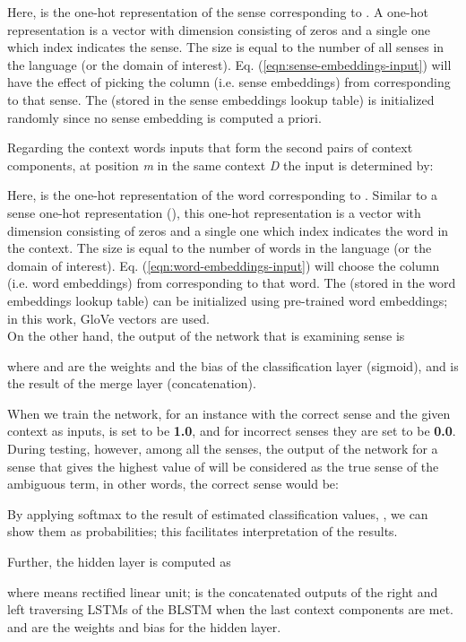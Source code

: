 \documentclass{llncs}
\begin{document}
Here,  is the one-hot representation of the sense corresponding to . A one-hot representation is a vector with dimension  consisting of  zeros and a single one which index indicates the sense. The  size is equal to the number of all senses in the language (or the domain of interest). Eq. (\ref{eqn:sense-embeddings-input}) will have the effect of picking the column (i.e. sense embeddings) from  corresponding to that sense. The  (stored in the sense embeddings lookup table) is initialized randomly since no sense embedding is computed a priori.


Regarding the context words inputs that form the second pairs of context components, at position \textit{m} in the same context \textit{D} the input is determined by:

Here,  is the one-hot representation of the word corresponding to . Similar to a sense one-hot representation (), this one-hot representation is a vector with dimension  consisting of  zeros and a single one which index indicates the word in the context. The  size is equal to the number of words in the language (or the domain of interest). Eq. (\ref{eqn:word-embeddings-input}) will choose the column (i.e. word embeddings) from  corresponding to that word. The  (stored in the word embeddings lookup table) can be initialized using pre-trained word embeddings; in this work, GloVe vectors are used.\\

On the other hand, the output of the network that is examining sense  is

where  and  are the weights and the bias of the classification layer (sigmoid), and  is the result of the merge layer (concatenation).

When we train the network, for an instance with the correct sense and the given context as inputs,  is set to be \textbf{1.0}, and for incorrect senses they are set to be \textbf{0.0}. During testing, however, among all the senses, the output of the network for a sense that gives the highest value of  will be considered as the true sense of the ambiguous term, in other words, the correct sense would be:

By applying softmax to the result of estimated classification values, , we can show them as probabilities; this facilitates interpretation of the results.

Further, the hidden layer  is computed as

where  means rectified linear unit;  is the concatenated outputs of the right and left traversing LSTMs of the BLSTM when the last context components are met.  and  are the weights and bias for the hidden layer.
\end{document}

